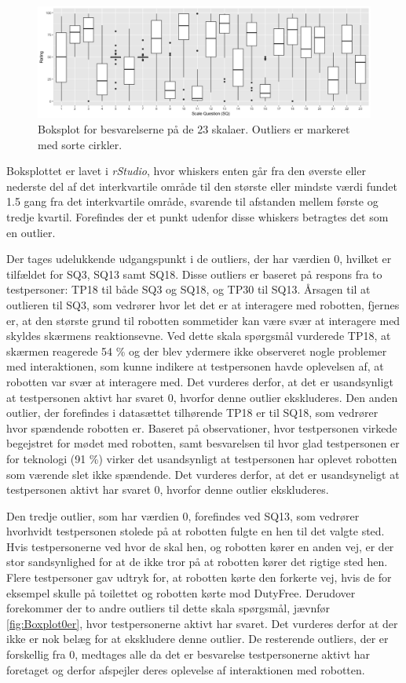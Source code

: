 %
\begin{figure}[H]
\centering
\includegraphics[width = \textwidth]{Figure/DatabehandlingSkalaer/Boksplot0er} 
\caption{Boksplot for besvarelserne på de 23 skalaer. Outliers er markeret med sorte cirkler.}
\label{fig:Boxplot0er}
\end{figure}
\noindent
%
Boksplottet er lavet i \textit{rStudio}, hvor whiskers enten går fra den øverste eller nederste del af det interkvartile område til den største eller mindste værdi fundet 1.5 gang fra det interkvartile område, svarende til afstanden mellem første og tredje kvartil. Forefindes der et punkt udenfor disse whiskers betragtes det som en outlier.

Der tages udelukkende udgangspunkt i de outliers, der har værdien 0, hvilket er tilfældet for SQ3, SQ13 samt SQ18. Disse outliers er baseret på respons fra to testpersoner: TP18 til både SQ3 og SQ18, og TP30 til SQ13. Årsagen til at outlieren til SQ3, som vedrører hvor let det er at interagere med robotten, fjernes er, at den største grund til robotten sommetider kan være svær at interagere med skyldes skærmens reaktionsevne. Ved dette skala spørgsmål vurderede TP18, at skærmen reagerede 54 \% og der blev ydermere ikke observeret nogle problemer med interaktionen, som kunne indikere at testpersonen havde oplevelsen af, at robotten var svær at interagere med. Det vurderes derfor, at det er usandsynligt at testpersonen aktivt har svaret 0, hvorfor denne outlier ekskluderes. Den anden outlier, der forefindes i datasættet tilhørende TP18 er til SQ18, som vedrører hvor spændende robotten er. Baseret på observationer, hvor testpersonen virkede begejstret for mødet med robotten, samt besvarelsen til hvor glad testpersonen er for teknologi (91 \%) virker det usandsynligt at testpersonen har oplevet robotten som værende slet ikke spændende. Det vurderes derfor, at det er usandsyneligt at testpersonen aktivt har svaret 0, hvorfor denne outlier ekskluderes.

Den tredje outlier, som har værdien 0, forefindes ved SQ13, som vedrører hvorhvidt testpersonen stolede på at robotten fulgte en hen til det valgte sted. Hvis testpersonerne ved hvor de skal hen, og robotten kører en anden vej, er der stor sandsynlighed for at de ikke tror på at robotten kører det rigtige sted hen. Flere testpersoner gav udtryk for, at robotten kørte den forkerte vej, hvis de for eksempel skulle på toilettet og robotten kørte mod DutyFree. Derudover forekommer der to andre outliers til dette skala spørgsmål, jævnfør \autoref{fig:Boxplot0er}, hvor testpersonerne aktivt har svaret. Det vurderes derfor at der ikke er nok belæg for at ekskludere denne outlier. \blankline
%
De resterende outliers, der er forskellig fra 0, medtages alle da det er besvarelse testpersonerne aktivt har foretaget og derfor afspejler deres oplevelse af interaktionen med robotten.  
